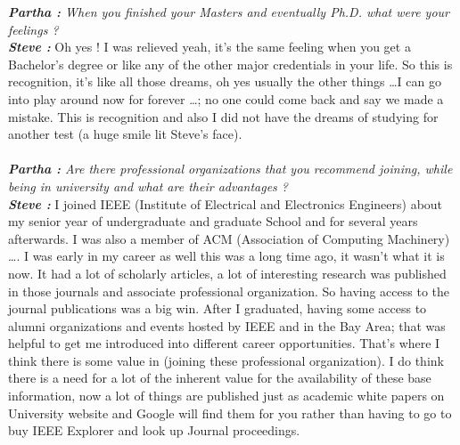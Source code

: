 \documentclass[a4paper, 12pt]{article}
\begin{document}
\begin{flushleft}
	\textit {\textbf{Partha :} When you finished your Masters and eventually Ph.D. what were your feelings ?} \\ 
        \textbf {\textit {Steve :}}  Oh yes ! I was relieved yeah, it's the same feeling when you get a Bachelor's degree or like any of the other major credentials in your life. So this is recognition, it's like all those dreams, oh yes usually the other things \ldots I can go into play around now for forever \ldots ; no one could come back and say we made a mistake. This is recognition and also I did not have the dreams of studying for another test (a huge smile lit Steve's face). \\~\\ 
	\textit {\textbf{Partha :} Are there professional organizations that you recommend joining, while being in university and what are their advantages ?} \\ 
        \textbf {\textit {Steve :}} I joined IEEE (Institute of Electrical and Electronics Engineers) about my senior year of undergraduate and graduate School and for several years afterwards. I was also a member of ACM (Association of Computing Machinery) \ldots . I was early in my career as well this was a long time ago, it wasn't what it is now. It had a lot of scholarly articles, a lot of interesting research was published in those journals and associate professional organization. So having access to the journal publications was a big win. After I graduated, having some access to alumni organizations and events hosted by IEEE and in the Bay Area; that was helpful to get me introduced into different career opportunities. That's where I think there is some value in (joining these professional organization). I do think there is a need for a lot of the inherent value for the availability of these base information, now a lot of things are published just as academic white papers on University website and Google will find them for you rather than having to go to buy IEEE Explorer and look up Journal proceedings.\\~\\ 


\end{flushleft}
\end{document}
